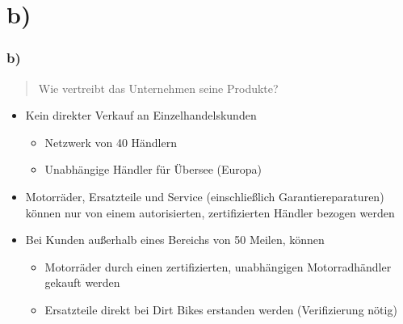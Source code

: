 \documentclass{beamer}
\begin{document}
\section{b)}
\begin{frame}
\frametitle{b)}

\begin{quote}
Wie vertreibt das Unternehmen seine Produkte?
\end{quote}

\begin{itemize}
\setlength{\itemsep}{14pt}
\item Kein direkter Verkauf an Einzelhandelskunden
\begin{itemize}
\item Netzwerk von 40 H\"andlern
\item Unabh\"angige H\"andler f\"ur \"Ubersee (Europa)
\end{itemize}
\item Motorr\"ader, Ersatzteile und Service (einschließlich Garantiereparaturen) können nur von einem autorisierten, zertifizierten H\"andler bezogen werden
\item Bei Kunden außerhalb eines Bereichs von 50 Meilen, k\"onnen 
\begin{itemize}
\item Motorr\"ader durch einen zertifizierten, unabhängigen Motorradh\"andler gekauft werden
\item Ersatzteile direkt bei Dirt Bikes erstanden werden (Verifizierung n\"otig)
\end{itemize}
\end{itemize}

\end{frame}
\end{document}
